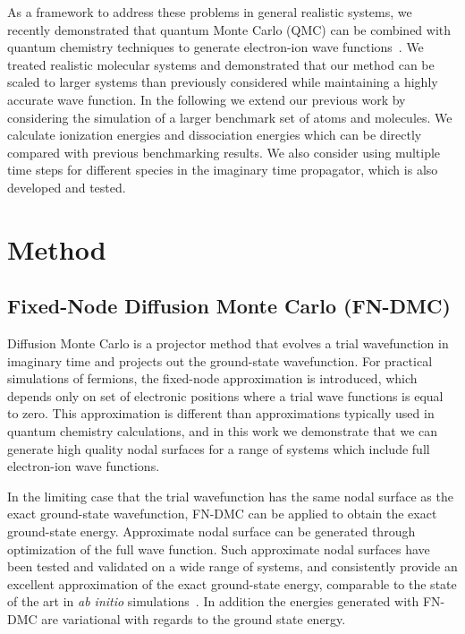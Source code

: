 \documentclass[pra,superscriptaddress,groupedaddress,twocolumn]{revtex4}
\begin{document}
As a framework to address these problems in general realistic systems, we recently demonstrated that quantum Monte Carlo (QMC) can be combined with quantum chemistry techniques to generate electron-ion wave functions~\cite{Tubman_ECG}.  We treated realistic molecular systems and demonstrated that our method can be scaled to larger systems than previously considered while maintaining a highly accurate wave function. In the following we extend our previous work by considering the simulation of a larger benchmark set of atoms and molecules.  We calculate ionization energies and dissociation energies which can be directly compared with previous benchmarking results.  We also consider using multiple time steps for different species in the imaginary time propagator, which is also developed and tested.  %

\section{Method}
\subsection{Fixed-Node Diffusion Monte Carlo (FN-DMC)}
Diffusion Monte Carlo is a projector method that evolves a trial wavefunction in imaginary time and projects out the ground-state wavefunction.  For practical simulations of fermions, the fixed-node approximation is introduced, which depends only on set of electronic positions where a trial wave functions is equal to zero.  This approximation is different than approximations typically used in quantum chemistry calculations, and in this work we demonstrate that we can generate high quality nodal surfaces for a range of systems which include full electron-ion wave functions. 

In the limiting case that the trial wavefunction has the same nodal surface as the exact ground-state wavefunction, FN-DMC can be applied to obtain the exact ground-state energy.  Approximate nodal surface can be generated through optimization of the full wave function. Such approximate nodal surfaces have been tested and validated on a wide range of systems, and consistently provide an excellent approximation of the exact ground-state energy,  comparable to the state of the art in \textit{ab initio} simulations~\cite{grossman1}. In addition the energies generated with FN-DMC are variational with regards to the ground state energy.
\end{document}
